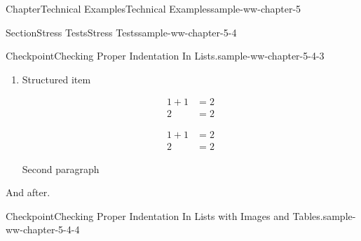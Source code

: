 \documentclass[oneside,10pt,]{book}
\numberwithin{equation}{section}
\newcommand{\amp}{&}
\begin{document}
\begin{chapterptx}{Chapter}{Technical Examples}{}{Technical Examples}{}{}{sample-ww-chapter-5}
\begin{sectionptx}{Section}{Stress Tests}{}{Stress Tests}{}{}{sample-ww-chapter-5-4}
\begin{inlineexercise}{Checkpoint}{Checking Proper Indentation In Lists.}{sample-ww-chapter-5-4-3}
\begin{enumerate}[label={\alph*.}]
\begin{enumerate}[label={\roman*.}]
\begin{equation*}
\begin{aligned}
2\amp=2
\end{aligned}
\end{equation*}
%
\par
paragraph%
\item{}Sublist Item%
\par
%
\begin{equation*}
\begin{aligned}
1+1\amp=2\\
2\amp=2
\end{aligned}
\end{equation*}
%
\par
%
\begin{equation*}
\begin{aligned}
1+1\amp=2\\
2\amp=2
\end{aligned}
\end{equation*}
%
\par
Second paragraph%
\end{enumerate}
%
\par
And%
\par
%
\begin{equation*}
\begin{aligned}
1+1\amp=2\\
2\amp=2
\end{aligned}
\end{equation*}
%
\par
after.%
\item{}Structured item%
\par
%
\begin{equation*}
\begin{aligned}
1+1\amp=2\\
2\amp=2
\end{aligned}
\end{equation*}
%
\par
%
\begin{equation*}
\begin{aligned}
1+1\amp=2\\
2\amp=2
\end{aligned}
\end{equation*}
%
\par
Second paragraph%
\end{enumerate}
%
\par
And after.%
\end{inlineexercise}%
\begin{inlineexercise}{Checkpoint}{Checking Proper Indentation In Lists with Images and Tables.}{sample-ww-chapter-5-4-4}%
%
\begin{enumerate}[label={\alph*.}]

\end{enumerate}
\end{inlineexercise}
\end{sectionptx}
\end{chapterptx}
\end{document}
